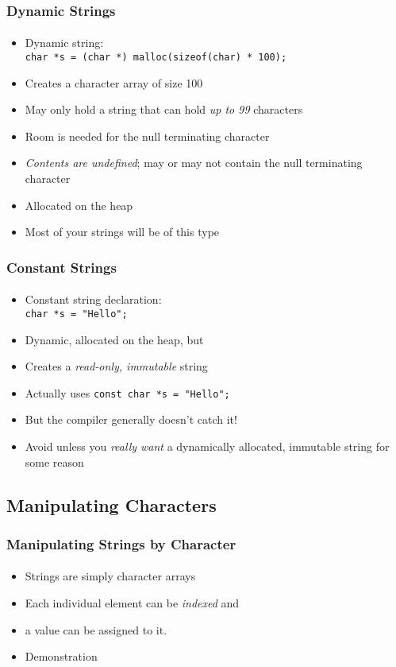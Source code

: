 \documentclass[]{beamer}
\begin{document}
\begin{frame}[fragile]
    \frametitle{Dynamic Strings}
    \framesubtitle{}

\begin{itemize}[<+->]
  \item Dynamic string:\\
    \texttt{char *s = (char *) malloc(sizeof(char) * 100);}    
  \item Creates a character array of size 100
  \item May only hold a string that can hold \emph{up to 99} characters
  \item Room is needed for the null terminating character
  \item \emph{Contents are undefined}; may or may not contain the null terminating character
  \item Allocated on the heap
  \item Most of your strings will be of this type
\end{itemize}
  
\end{frame}

\begin{frame}[fragile]
    \frametitle{Constant Strings}
    \framesubtitle{}

\begin{itemize}[<+->]
  \item Constant string declaration: \\
    \texttt{char *s = "Hello";}   
  \item Dynamic, allocated on the heap, but
  \item Creates a \emph{read-only, immutable} string
  \item Actually uses \texttt{const char *s = "Hello";} 
  \item But the compiler generally doesn't catch it!
  \item Avoid unless you \emph{really want} a dynamically allocated, immutable string for some reason
\end{itemize}
  
\end{frame}

\subsection{Manipulating Characters}

\begin{frame}[fragile]
    \frametitle{Manipulating Strings by Character}
    \framesubtitle{}

\begin{itemize}[<+->]
  \item Strings are simply character arrays
  \item Each individual element can be \emph{indexed} and 
  \item a value can be assigned to it.
  \item Demonstration
\end{itemize}
  
\end{frame}
\end{document}
